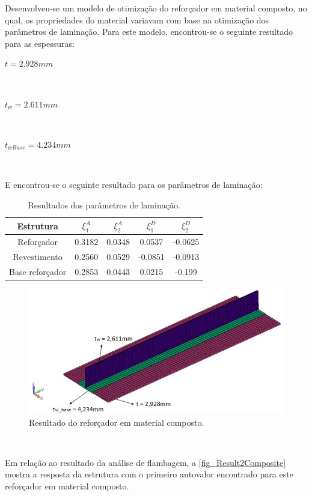 Desenvolveu-se um modelo de otimização do reforçador em material composto, no qual, os propriedades do material variavam com base na otimização dos parâmetros de laminação. Para este modelo, encontrou-se o seguinte resultado para as espessuras:\

\centerline{$t = 2.928 mm$}\

\centerline{$t_w = 2.611 mm$}\

\centerline{$t_{wBase} = 4.234 mm$}\

E encontrou-se o seguinte resultado para os parâmetros de laminação:\

\begin{table}[h]
\centering
\begin{tabular}{ccccc}
\toprule
Estrutura & $\xi^A_{1}$ & $\xi^A_{2}$ & $\xi^D_{1}$ & $\xi^D_{2}$ \\ \midrule
Reforçador & 0.3182 & 0.0348 & 0.0537 & -0.0625\\
Revestimento & 0.2560 & 0.0529 & -0.0851 & -0.0913\\
Base reforçador & 0.2853 & 0.0443 & 0.0215 & -0.199\\
\bottomrule
\end{tabular}
\caption{Resultados dos parâmetros de laminação.}
\label{tbl:result_qsis}
\end{table}


\begin{figure}[ht]
 \caption{\label{fig_Result1Composite}Resultado do reforçador em material composto.}
 \centering
 \includegraphics[scale=0.85]{figura/Results_Composite}
\end{figure}
\

Em relação ao resultado da análise de flambagem, a \autoref{fig_Result2Composite} mostra a resposta da estrutura com o primeiro autovalor encontrado para este reforçador em material composto.

